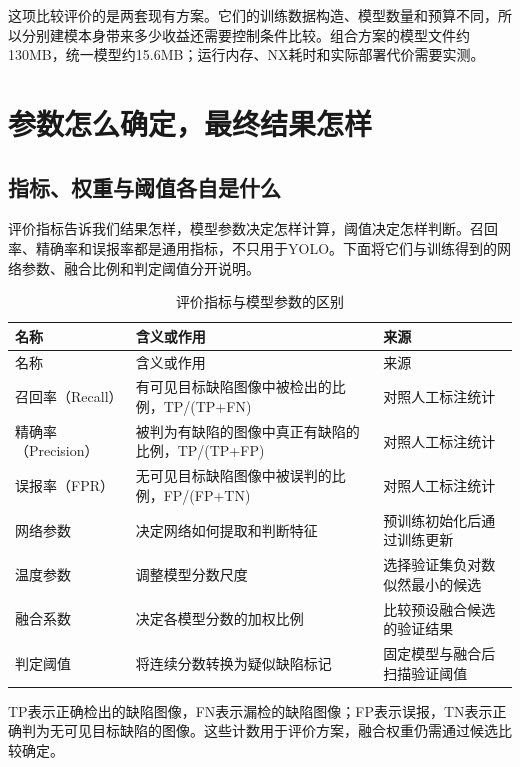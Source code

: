 这项比较评价的是两套现有方案。它们的训练数据构造、模型数量和预算不同，所以分别建模本身带来多少收益还需要控制条件比较。组合方案的模型文件约130MB，统一模型约15.6MB；运行内存、NX耗时和实际部署代价需要实测。

\FloatBarrier{}\section{参数怎么确定，最终结果怎样}
\FloatBarrier{}\subsection{指标、权重与阈值各自是什么}
评价指标告诉我们结果怎样，模型参数决定怎样计算，阈值决定怎样判断。召回率、精确率和误报率都是通用指标，不只用于YOLO。下面将它们与训练得到的网络参数、融合比例和判定阈值分开说明。


\begingroup\small{}
\begin{longtable}{@{}>{\raggedright\arraybackslash}p{0.240\dimexpr\linewidth-4\tabcolsep\relax}>{\raggedright\arraybackslash}p{0.340\dimexpr\linewidth-4\tabcolsep\relax}>{\raggedright\arraybackslash}p{0.420\dimexpr\linewidth-4\tabcolsep\relax}@{}}
\caption{评价指标与模型参数的区别}\\
\toprule
名称 & 含义或作用 & 来源 \\
\midrule\endfirsthead
\toprule
名称 & 含义或作用 & 来源 \\
\midrule\endhead
\midrule\multicolumn{3}{r}{\footnotesize 续下页}\endfoot
\bottomrule\endlastfoot
召回率（Recall） & 有可见目标缺陷图像中被检出的比例，TP/(TP+FN) & 对照人工标注统计 \\
精确率（Precision） & 被判为有缺陷的图像中真正有缺陷的比例，TP/(TP+FP) & 对照人工标注统计 \\
误报率（FPR） & 无可见目标缺陷图像中被误判的比例，FP/(FP+TN) & 对照人工标注统计 \\
网络参数 & 决定网络如何提取和判断特征 & 预训练初始化后通过训练更新 \\
温度参数 & 调整模型分数尺度 & 选择验证集负对数似然最小的候选 \\
融合系数 & 决定各模型分数的加权比例 & 比较预设融合候选的验证结果 \\
判定阈值 & 将连续分数转换为疑似缺陷标记 & 固定模型与融合后扫描验证阈值 \\
\end{longtable}\endgroup

TP表示正确检出的缺陷图像，FN表示漏检的缺陷图像；FP表示误报，TN表示正确判为无可见目标缺陷的图像。这些计数用于评价方案，融合权重仍需通过候选比较确定。

